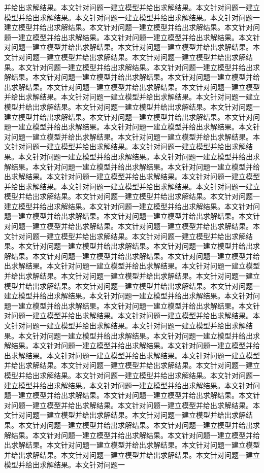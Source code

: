 并给出求解结果。本文针对问题一建立模型并给出求解结果。本文针对问题一建立模型并给出求解结果。本文针对问题一建立模型并给出求解结果。本文针对问题一建立模型并给出求解结果。本文针对问题一建立模型并给出求解结果。本文针对问题一建立模型并给出求解结果。本文针对问题一建立模型并给出求解结果。本文针对问题一建立模型并给出求解结果。本文针对问题一建立模型并给出求解结果。本文针对问题一建立模型并给出求解结果。本文针对问题一建立模型并给出求解结果。本文针对问题一建立模型并给出求解结果。本文针对问题一建立模型并给出求解结果。本文针对问题一建立模型并给出求解结果。本文针对问题一建立模型并给出求解结果。本文针对问题一建立模型并给出求解结果。本文针对问题一建立模型并给出求解结果。本文针对问题一建立模型并给出求解结果。本文针对问题一建立模型并给出求解结果。本文针对问题一建立模型并给出求解结果。本文针对问题一建立模型并给出求解结果。本文针对问题一建立模型并给出求解结果。本文针对问题一建立模型并给出求解结果。本文针对问题一建立模型并给出求解结果。本文针对问题一建立模型并给出求解结果。本文针对问题一建立模型并给出求解结果。本文针对问题一建立模型并给出求解结果。本文针对问题一建立模型并给出求解结果。本文针对问题一建立模型并给出求解结果。本文针对问题一建立模型并给出求解结果。本文针对问题一建立模型并给出求解结果。本文针对问题一建立模型并给出求解结果。本文针对问题一建立模型并给出求解结果。本文针对问题一建立模型并给出求解结果。本文针对问题一建立模型并给出求解结果。本文针对问题一建立模型并给出求解结果。本文针对问题一建立模型并给出求解结果。本文针对问题一建立模型并给出求解结果。本文针对问题一建立模型并给出求解结果。本文针对问题一建立模型并给出求解结果。本文针对问题一建立模型并给出求解结果。本文针对问题一建立模型并给出求解结果。本文针对问题一建立模型并给出求解结果。本文针对问题一建立模型并给出求解结果。本文针对问题一建立模型并给出求解结果。本文针对问题一建立模型并给出求解结果。本文针对问题一建立模型并给出求解结果。本文针对问题一建立模型并给出求解结果。本文针对问题一建立模型并给出求解结果。本文针对问题一建立模型并给出求解结果。本文针对问题一建立模型并给出求解结果。本文针对问题一建立模型并给出求解结果。本文针对问题一建立模型并给出求解结果。本文针对问题一建立模型并给出求解结果。本文针对问题一建立模型并给出求解结果。本文针对问题一建立模型并给出求解结果。本文针对问题一建立模型并给出求解结果。本文针对问题一建立模型并给出求解结果。本文针对问题一建立模型并给出求解结果。本文针对问题一建立模型并给出求解结果。本文针对问题一建立模型并给出求解结果。本文针对问题一建立模型并给出求解结果。本文针对问题一建立模型并给出求解结果。本文针对问题一建立模型并给出求解结果。本文针对问题一建立模型并给出求解结果。本文针对问题一建立模型并给出求解结果。本文针对问题一建立模型并给出求解结果。本文针对问题一建立模型并给出求解结果。本文针对问题一建立模型并给出求解结果。本文针对问题一建立模型并给出求解结果。本文针对问题一建立模型并给出求解结果。本文针对问题一建立模型并给出求解结果。本文针对问题一建立模型并给出求解结果。本文针对问题一建立模型并给出求解结果。本文针对问题一建立模型并给出求解结果。本文针对问题一建立模型并给出求解结果。本文针对问题一建立模型并给出求解结果。本文针对问题一建立模型并给出求解结果。本文针对问题一建立模型并给出求解结果。本文针对问题一建立模型并给出求解结果。本文针对问题一建立模型并给出求解结果。本文针对问题一建立模型并给出求解结果。本文针对问题一建立模型并给出求解结果。本文针对问题一建立模型并给出求解结果。本文针对问题一建立模型并给出求解结果。本文针对问题一建立模型并给出求解结果。本文针对问题一建立模型并给出求解结果。本文针对问题一